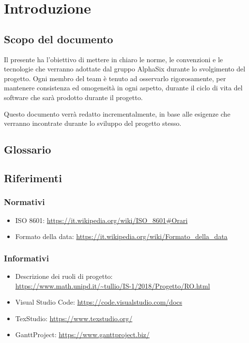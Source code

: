 \section{Introduzione}

\subsection{Scopo del documento} %
    Il presente  ha l’obiettivo di mettere in chiaro le norme, le convenzioni e le tecnologie
    che verranno adottate dal gruppo AlphaSix durante lo svolgimento del progetto\GAlt. Ogni membro del team
    \`e tenuto ad osservarlo rigorosamente, per mantenere consistenza ed omogeneit\`a in ogni aspetto, durante il ciclo di
    vita del software che sarà prodotto durante il progetto.\par
    Questo documento verr\`a redatto incrementalmente, in base alle esigenze che verranno incontrate durante lo sviluppo del
    progetto stesso.


\subsection{Glossario}


\subsection{Riferimenti}

    \subsubsection{Normativi}	\label{rifnorma}
    \begin{itemize}
    	\item ISO 8601: \url{https://it.wikipedia.org/wiki/ISO\_8601#Orari}
    	\item Formato della data: \url{https://it.wikipedia.org/wiki/Formato\_della\_data}
    \end{itemize}

    \subsubsection{Informativi}	\label{rifinfo}
    \begin{itemize}
        \item Descrizione dei ruoli di progetto: \\\url{https://www.math.unipd.it/~tullio/IS-1/2018/Progetto/RO.html}
        \item Visual Studio Code: \url{https://code.visualstudio.com/docs}
        \item TexStudio: \url{https://www.texstudio.org/}
        \item GanttProject: \url{https://www.ganttproject.biz/}
	\end{itemize}
